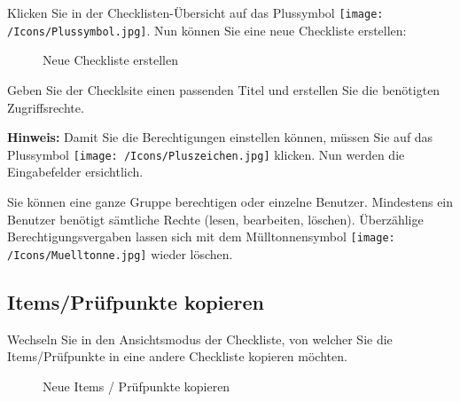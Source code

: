 Klicken Sie in der Checklisten-Übersicht auf das Plussymbol \texttt{[image: /Icons/Plussymbol.jpg]}. Nun  können Sie eine neue Checkliste erstellen:

\begin{figure}[H]
\caption{Neue Checkliste erstellen}
\end{figure}

Geben Sie der Checklsite einen passenden Titel  und erstellen Sie die benötigten Zugriffsrechte.

\vspace{\baselineskip}

\textbf{Hinweis:} Damit Sie die Berechtigungen einstellen können, müssen Sie auf das Plussymbol \texttt{[image: /Icons/Pluszeichen.jpg]}  klicken. Nun werden die Eingabefelder ersichtlich.

\vspace{\baselineskip}

Sie können eine ganze Gruppe berechtigen oder einzelne Benutzer. Mindestens ein Benutzer benötigt sämtliche Rechte (lesen, bearbeiten, löschen). Überzählige Berechtigungsvergaben lassen sich mit dem Mülltonnensymbol \texttt{[image: /Icons/Muelltonne.jpg]} wieder löschen.

\subsection{Items/Prüfpunkte kopieren}

Wechseln Sie in den Ansichtsmodus der Checkliste, von welcher Sie die Items/Prüfpunkte in eine andere Checkliste kopieren möchten.

\begin{figure}[H]
\caption{Neue Items / Prüfpunkte kopieren}
\end{figure}

